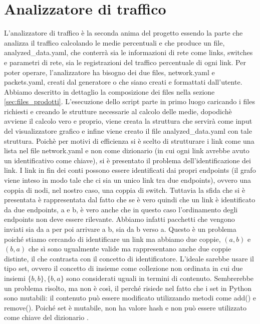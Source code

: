 \documentclass[binding=0.6cm]{sapthesis}
\begin{document}
\chapter{Analizzatore di traffico}
L'analizzatore di traffico è la seconda anima del progetto essendo la parte che analizza il traffico calcolando le medie percentuali e che produce
un file, analyzed\_data.yaml, che conterrà sia le informazioni di rete come links, switches e parametri di rete, sia le registrazioni del traffico percentuale
di ogni link. Per poter operare, l'analizzatore ha bisogno dei due files, network.yaml e packets.yaml, creati dal generatore o che siano
creati e formattati dall'utente. Abbiamo descritto in dettaglio la composizione dei files nella sezione \ref{sec:files_prodotti}.
L'esecuzione dello script parte in primo luogo caricando i files richiesti e creando le strutture necessarie al calcolo delle medie, dopodichè
avviene il calcolo vero e proprio, viene creata la struttura che servirà come input del visualizzatore grafico e infine viene creato il file
analyzed\_data.yaml con tale struttura.
Poichè per motivi di efficienza si è scelto di strutturare i link come una lista nel file network.yaml e non come dizionario (in cui ogni link avrebbe avuto un identificativo come chiave), si è presentato il problema dell'identificazione dei link.
I link in fin dei conti possono essere identificati dai propri endpoints (il grafo viene inteso in modo tale che ci sia un unico link tra due endpoints), ovvero una coppia di nodi,
nel nostro caso, una coppia di switch. Tuttavia la sfida che si è presentata è rappresentata dal fatto che se è vero quindi che un link è identificato
da due endpoints, a e b, è vero anche che in questo caso l'ordinamento degli endpoints non deve essere rilevante. Abbiamo infatti pacchetti
che vengono inviati sia da a per poi arrivare a b, sia da b verso a. Questo è un problema poiché stiamo cercando di identificare un link ma abbiamo
due coppie, \((a, b)\) e \((b, a)\) che sì sono ugualmente valide ma rappresentano anche due coppie distinte, il che contrasta con il concetto di identificatore. 
L'ideale sarebbe usare il tipo set, ovvero il concetto di insieme 
come collezione non ordinata in cui due insiemi \(\{b, b\}, \{b, a\}\) sono considerati uguali in termini di contenuto. Sembrerebbe un problema risolto, ma non è così, il perché risiede
nel fatto che i set in Python sono mutabili: il contenuto può essere modificato utilizzando metodi come add() e remove(). 
Poiché set è mutabile, non ha valore hash \cite{pythonGlossaryHashable} e non può essere utilizzato come chiave del dizionario \cite{pythonStdTypesMapping}.
\end{document}
